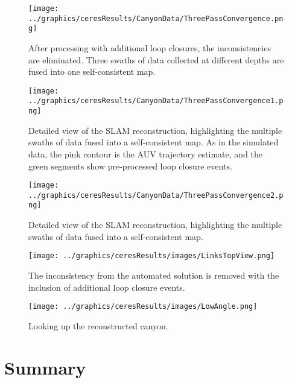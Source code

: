  \begin{figure}[!htb]
   \centering
   \texttt{[image: ../graphics/ceresResults/CanyonData/ThreePassConvergence.png]} %
   \caption{After processing with additional loop closures, the inconsistencies are eliminated. Three swaths of data collected at different depths are fused into one self-consistent map. }
   \label{fig:RealDataSolution1}
\end{figure}

 \begin{figure}[!htb]
   \centering
   \texttt{[image: ../graphics/ceresResults/CanyonData/ThreePassConvergence1.png]} %
   \caption{Detailed view of the SLAM reconstruction, highlighting the multiple swaths of data fused into a self-consistent map. As in the simulated data, the pink contour is the AUV trajectory estimate, and the green segments show pre-processed loop closure events. }
   \label{fig:RealDataSolution2}
\end{figure}

 \begin{figure}[!htb]
   \centering
   \texttt{[image: ../graphics/ceresResults/CanyonData/ThreePassConvergence2.png]} %
   \caption{Detailed view of the SLAM reconstruction, highlighting the multiple swaths of data fused into a self-consistent map. }
   \label{fig:RealDataSolution3}
\end{figure}

 \begin{figure}[!htb]
   \centering
   \texttt{[image: ../graphics/ceresResults/images/LinksTopView.png]} %
   \caption{The inconsistency from the automated solution is removed with the inclusion of additional loop closure events.}
   \label{fig:RealDataSolution4}
\end{figure}

 \begin{figure}[!htb]
   \centering
   \texttt{[image: ../graphics/ceresResults/images/LowAngle.png]} %
   \caption{Looking up the reconstructed canyon.}
   \label{fig:RealDataSolution5}
\end{figure}

\section{Summary}

